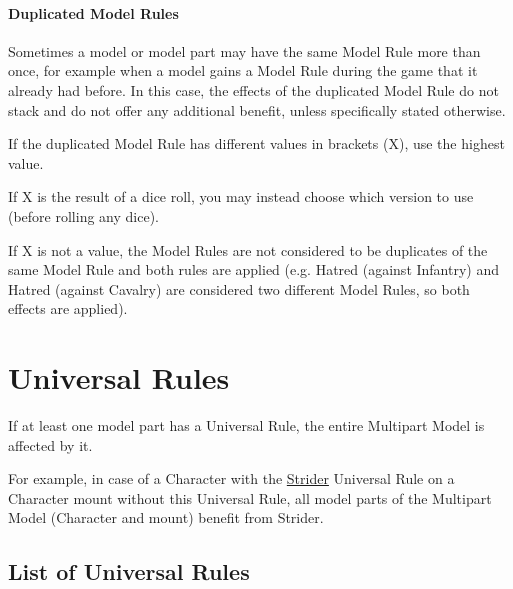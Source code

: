 \begin{multicols}{3}
\vspace*{-5pt}
\end{multicols}

\paragraph{Duplicated Model Rules}

Sometimes a model or model part may have the same Model Rule more than once, for example when a model gains a Model Rule during the game that it already had before. In this case, the effects of the duplicated Model Rule do not stack and do not offer any additional benefit, unless specifically stated otherwise.

If the duplicated Model Rule has different values in brackets (X), use the highest value.

If X is the result of a dice roll, you may instead choose which version to use (before rolling any dice).

If X is not a value, the Model Rules are not considered to be duplicates of the same Model Rule and both rules are applied (e.g. Hatred (against Infantry) and Hatred (against Cavalry) are considered two different Model Rules, so both effects are applied).

\section{Universal Rules}
\idx[main=y]{\universalrules}\label{universal_rules}

If at least one model part has a Universal Rule, the entire Multipart Model is affected by it.

For example, in case of a Character with the \hyperref[strider]{Strider} Universal Rule on a Character mount without this Universal Rule, all model parts of the Multipart Model (Character and mount) benefit from Strider.

\subsection{List of Universal Rules}
\label{list_of_universal_rules}

